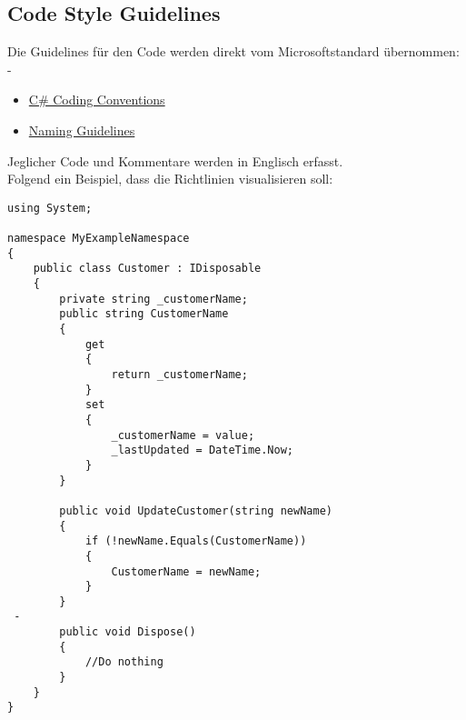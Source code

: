 \subsection{Code Style Guidelines}
Die Guidelines für den Code werden direkt vom Microsoftstandard übernommen: 
\\-
\begin{itemize}
	\item \href{http://msdn.microsoft.com/en-us/library/ff926074.aspx}{C\# Coding Conventions}
	\item \href{http://msdn.microsoft.com/en-us/library/xzf533w0(v=vs.71).aspx}{Naming Guidelines}
\end{itemize}
Jeglicher Code und Kommentare werden in Englisch erfasst.
\\Folgend ein Beispiel, dass die Richtlinien visualisieren soll:
\begin{lstlisting}[language=CSharp, caption=Hello World in C\#, label=lst:helloWorldCSharp, firstnumber=1]
using System;

namespace MyExampleNamespace
{
    public class Customer : IDisposable
    {
        private string _customerName;
        public string CustomerName 
        { 
            get 
            { 
                return _customerName; 
            }
            set
            {
                _customerName = value;
                _lastUpdated = DateTime.Now;
            }
        }

        public void UpdateCustomer(string newName)
        {
            if (!newName.Equals(CustomerName))
            {
                CustomerName = newName;
            }
        }
 -
        public void Dispose()
        {
            //Do nothing
        }
    }
}
\end{lstlisting}

